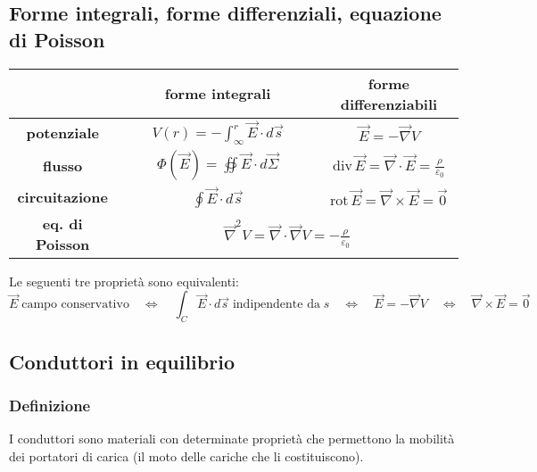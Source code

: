 \documentclass[a4paper]{article}
\newcommand\nab{\vec{\nabla}} %
\begin{document}
\subsection{Forme integrali, forme differenziali, equazione di Poisson}
\begin{center}
	\def\arraystretch{2.5}
	\begin{tabular}{c c c}
		& \textbf{forme integrali} & \textbf{forme differenziabili} \\
		\toprule
		\textbf{potenziale} & \(\displaystyle \qquad V(r) = - \int_\infty^r \vec{E} \cdot d\vec{s} \qquad\) & \(\displaystyle \vec{E} = - \nab V\) \\[7pt]
		\hline
		\textbf{flusso} & \(\displaystyle \qquad \Phi(\vec{E}) = \oiint \vec{E} \cdot d\vec{\Sigma} \qquad\) & \(\displaystyle \text{div} \, \vec{E} = \nab \cdot \vec{E} = \frac{\rho}{\varepsilon_0}\) \\[7pt]
		\hline
		\textbf{circuitazione} & \(\displaystyle \qquad \oint \vec{E} \cdot d\vec{s} \qquad\) & \(\displaystyle \text{rot} \, \vec{E} = \nab \times \vec{E} = \vec{0}\) \\[7pt]
		\bottomrule
		\bottomrule
		\textbf{eq. di Poisson} & \multicolumn{2}{c}{\(\displaystyle \nab^2 V = \nab \cdot \nab V = - \frac{\rho}{\varepsilon_0}\)} \\
		\bottomrule
	\end{tabular}
\end{center}
Le seguenti tre proprietà sono equivalenti:
\[\vec{E} \; \text{campo conservativo} \quad \Leftrightarrow \quad \int_C \vec{E} \cdot d\vec{s} \; \text{indipendente da} \; s \quad \Leftrightarrow \quad \vec{E} = - \nab V \quad \Leftrightarrow \quad \nab \times \vec{E} = \vec{0}\]

\newpage

\subsection{Conduttori in equilibrio}
\subsubsection*{Definizione}
I conduttori sono materiali con determinate proprietà che permettono la mobilità dei portatori di carica (il moto delle cariche
che li costituiscono).
\end{document}
